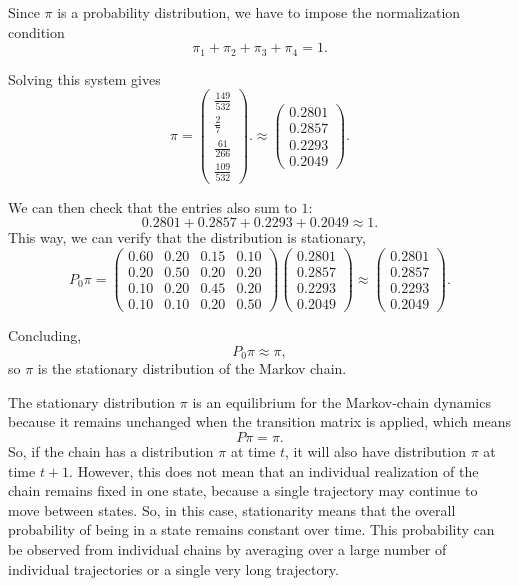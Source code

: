 Since \(\pi\) is a probability distribution, we have to impose the normalization condition
\[
\pi_1+\pi_2+\pi_3+\pi_4=1.
\]

Solving this system gives
\[
\pi =
\begin{pmatrix}
\frac{149}{532}\\[2mm]
\frac{2}{7}\\[2mm]
\frac{61}{266}\\[2mm]
\frac{109}{532}
\end{pmatrix}.
\approx
\begin{pmatrix}
0.2801\\
0.2857\\
0.2293\\
0.2049
\end{pmatrix}.
\]

We can then check that the entries also sum to \(1\):
\[
0.2801 + 0.2857 + 0.2293 + 0.2049 \approx 1.
\]
This way, we can verify that the distribution is stationary,
\[
P_0\pi =
\begin{pmatrix}
0.60 & 0.20 & 0.15 & 0.10\\
0.20 & 0.50 & 0.20 & 0.20\\
0.10 & 0.20 & 0.45 & 0.20\\
0.10 & 0.10 & 0.20 & 0.50
\end{pmatrix}
\begin{pmatrix}
0.2801\\
0.2857\\
0.2293\\
0.2049
\end{pmatrix}
\approx
\begin{pmatrix}
0.2801\\
0.2857\\
0.2293\\
0.2049
\end{pmatrix}.
\]

Concluding,
\[
P_0\pi \approx \pi,
\]
so \(\pi\) is the stationary distribution of the Markov chain.

The stationary distribution \(\pi\) is an equilibrium for the Markov-chain dynamics because it remains unchanged when the transition matrix is applied, which means
\[
P\pi = \pi.
\]
So, if the chain has a distribution \(\pi\) at time \(t\), it will also have distribution \(\pi\) at time \(t+1\). However, this does not mean that an individual realization of the chain remains fixed in one state, because a single trajectory may continue to move between states. So, in this case, stationarity means that the overall probability of being in a state remains constant over time.
This probability can be observed from individual chains by averaging over a large number of individual trajectories or a single very long trajectory.

